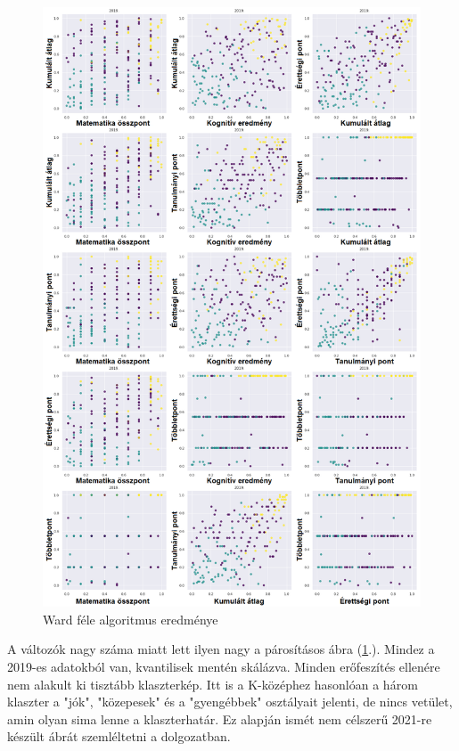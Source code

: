 \documentclass[12pt]{article}
\begin{document}
\begin{figure}[H]
\centering
\includegraphics[scale = 0.57]{kepek/klacterward.png}
\caption{Ward féle algoritmus eredménye}
\label{fig:klacterward}
\end{figure}

A változók nagy száma miatt lett ilyen nagy a párosításos ábra (\ref{fig:klacterward}.). Mindez a 2019-es adatokból van, kvantilisek mentén skálázva. Minden erőfeszítés ellenére nem alakult ki tisztább klaszterkép. Itt is a K-középhez hasonlóan a három klaszter a "jók", "közepesek" és a "gyengébbek" osztályait jelenti, de nincs vetület, amin olyan sima lenne a klaszterhatár. Ez alapján ismét nem célszerű 2021-re készült ábrát szemléltetni a dolgozatban.
\end{document}
